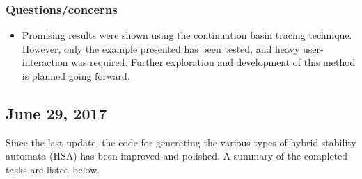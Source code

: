 \documentclass[12pt]{article}
\begin{document}
\subsubsection{Questions/concerns}
\begin{itemize}
\item Promising results were shown using the continuation basin tracing technique. However, only the example presented has been tested, and heavy user-interaction was required. Further exploration and development of this method is planned going forward.
\end{itemize}


\subsection{June 29, 2017}
Since the last update, the code for generating the various types of hybrid stability automata (HSA) has been improved and polished. A summary of the completed tasks are listed below.
\end{document}
